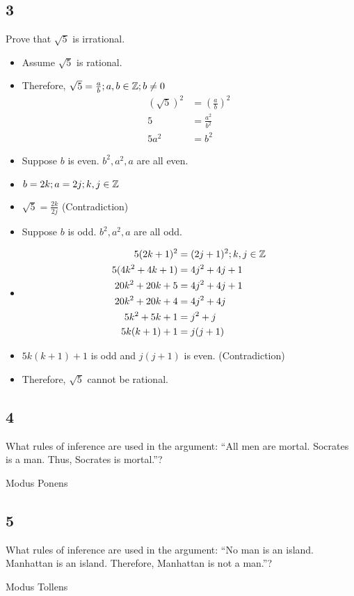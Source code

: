 \documentclass[letterpaper, 12pt]{math}
\begin{document}
\subsection*{3}
Prove that \( \sqrt{5} \) is irrational.
\begin{itemize}
  \item Assume \( \sqrt{5} \) is rational.
  \item Therefore, \( \sqrt{5} = \frac{a}{b}; a,b\in\mathbb{Z}; b\neq 0 \)
    \begin{align*}
      (\sqrt{5})^{2} &= (\frac{a}{b})^{2} \\
      5 &= \frac{a^{2}}{b^{2}} \\
      5a^{2} &= b^{2}
    \end{align*}
  \item Suppose \( b \) is even. \( b^{2}, a^{2}, a \) are all even.
  \item \( b = 2k; a = 2j; k,j\in\mathbb{Z} \)
  \item \( \sqrt{5} = \frac{2k}{2j} \) (Contradiction)
  \item Suppose \( b \) is odd. \( b^{2}, a^{2}, a \) are all odd.
  \item
    \begin{align*}
      5(2k+1)^{2} &= (2j+1)^{2}; k,j\in\mathbb{Z} \\
      5(4k^{2}+4k+1) &= 4j^{2}+4j+1 \\
      20k^{2}+20k+5 &= 4j^{2}+4j+1 \\
      20k^{2}+20k+4 &= 4j^{2}+4j \\
      5k^{2}+5k+1 &= j^{2}+j \\
      5k(k+1)+1 &= j(j+1)
    \end{align*}
  \item \( 5k(k+1)+1 \) is odd and \( j(j+1) \) is even. (Contradiction)
  \item Therefore, \( \sqrt{5} \) cannot be rational.
\end{itemize}

\subsection*{4}
What rules of inference are used in the argument: ``All men are mortal. Socrates
is a man. Thus, Socrates is mortal.''? \par
Modus Ponens

\subsection*{5}
What rules of inference are used in the argument: ``No man is an island.
Manhattan is an island. Therefore, Manhattan is not a man.''? \par
Modus Tollens
\end{document}
